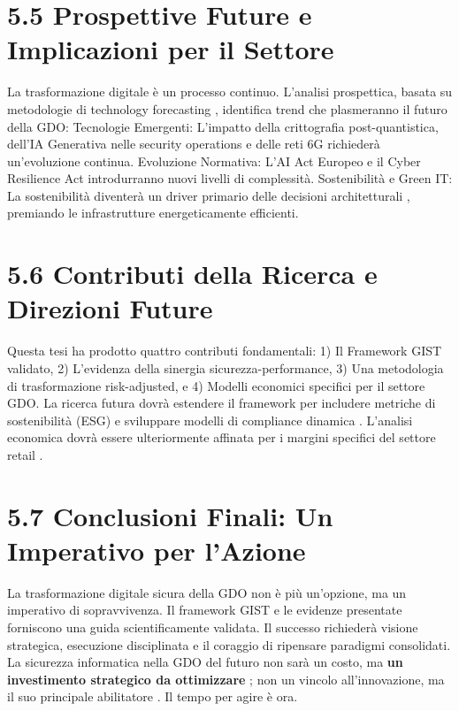 \section{5.5 Prospettive Future e Implicazioni per il Settore}

La trasformazione digitale è un processo continuo. L'analisi prospettica, basata su metodologie di technology forecasting \autocite{linstone2002,martino1993}, identifica trend che plasmeranno il futuro della GDO:
Tecnologie Emergenti: L'impatto della crittografia post-quantistica, dell'IA Generativa nelle security operations e delle reti 6G richiederà un'evoluzione continua.
Evoluzione Normativa: L'AI Act Europeo e il Cyber Resilience Act \autocite{ec2024digital} introdurranno nuovi livelli di complessità.
Sostenibilità e Green IT: La sostenibilità diventerà un driver primario delle decisioni architetturali \autocite{greengrid2024}, premiando le infrastrutture energeticamente efficienti.

\section{5.6 Contributi della Ricerca e Direzioni Future}

Questa tesi ha prodotto quattro contributi fondamentali: 1) Il Framework GIST validato, 2) L'evidenza della sinergia sicurezza-performance, 3) Una metodologia di trasformazione risk-adjusted, e 4) Modelli economici specifici per il settore GDO. La ricerca futura dovrà estendere il framework per includere metriche di sostenibilità (ESG) \autocite{eurostat2024} e sviluppare modelli di compliance dinamica \autocite{parmenter2019}. L'analisi economica dovrà essere ulteriormente affinata per i margini specifici del settore retail \autocite{bcg2024,mckinsey2024digital,accenture2024tech}.

\section{5.7 Conclusioni Finali: Un Imperativo per l'Azione}

La trasformazione digitale sicura della GDO non è più un'opzione, ma un imperativo di sopravvivenza. Il framework GIST e le evidenze presentate forniscono una guida scientificamente validata. Il successo richiederà visione strategica, esecuzione disciplinata \autocite{mckinsey2023} e il coraggio di ripensare paradigmi consolidati. La sicurezza informatica nella GDO del futuro non sarà un costo, ma \textbf{un investimento strategico da ottimizzare} \autocite{forrester2024cloud}; non un vincolo all'innovazione, ma il suo principale abilitatore \autocite{gartner2024market}. Il tempo per agire è ora.


